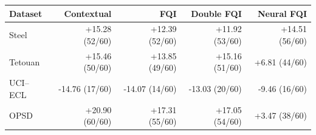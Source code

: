 \begin{tabular}{lrrrr}
\toprule
Dataset & Contextual & FQI & Double FQI & Neural FQI \\
\midrule
Steel & +15.28 (52/60) & +12.39 (52/60) & +11.92 (53/60) & +14.51 (56/60) \\
Tetouan & +15.46 (50/60) & +13.85 (49/60) & +15.16 (51/60) & +6.81 (44/60) \\
UCI--ECL & -14.76 (17/60) & -14.07 (14/60) & -13.03 (20/60) & -9.46 (16/60) \\
OPSD & +20.90 (60/60) & +17.31 (55/60) & +17.05 (54/60) & +3.47 (38/60) \\
\bottomrule
\end{tabular}
